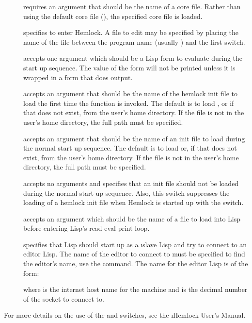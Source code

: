 \begin{description}

\item[] requires an argument that should be the name of a
core file.  Rather than using the default core file
(), the specified core file is
loaded.

\item[] specifies to enter Hemlock.  A file to edit may be
specified by placing the name of the file between the program name
(usually ) and the first switch.

\item[]
accepts one argument which should be a Lisp form to evaluate during
the start up sequence.  The value of the form will not be printed unless it is
wrapped in a form that does output.

\item[]
accepts an argument that should be the name of
the hemlock init file to load the first time the function
 is invoked.  The default is to load
, or if that does not
exist,  from the user's home directory.  If
the file is not in the user's home directory, the full path must be
specified.

\item[] accepts an argument that should be the name of an
init file to load during the normal start up sequence.  The default is
to load  or, if that does not exist,
 from the user's home directory.  If the file is not in
the user's home directory, the full path must be specified.

\item[]
accepts no arguments and specifies that an init file should not
be loaded during the normal start up sequence.  Also, this switch
suppresses the loading of a hemlock init file when Hemlock is started up
with the  switch.

\item[]
accepts an argument which should be the name of a file to load
into Lisp before entering Lisp's read-eval-print loop.

\item[] specifies that Lisp should start up as a \i{slave}
Lisp and try to connect to an editor Lisp.  The name of the editor to
connect to must be specified \dash{} to find the editor's name, use the
\hemlock{}  command.  The name for
the editor Lisp is of the form:
\begin{example}
\code{:}
\end{example}
where  is the internet host name for the machine and
 is the decimal number of the socket to connect to.
\end{description}
For more details on the use of the  and 
switches, see the \i{Hemlock User's Manual}.

